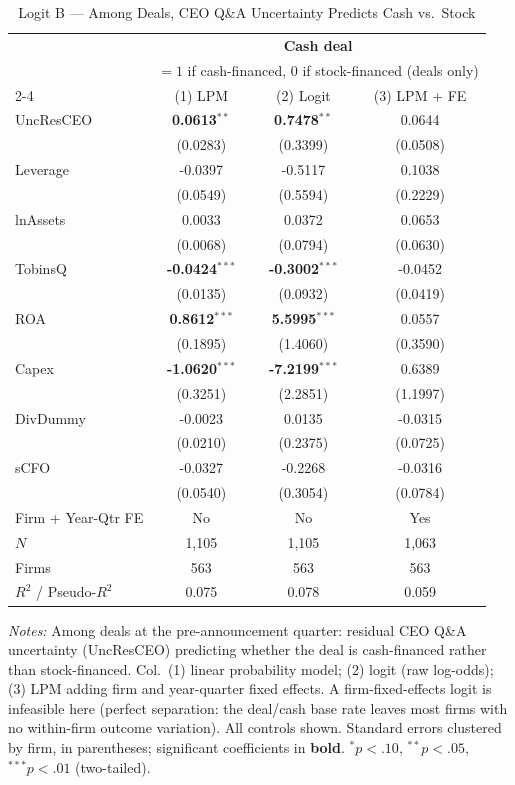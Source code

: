 \clearpage
\begin{table}[htbp]\centering
\caption{Logit B --- Among Deals, CEO Q\&A Uncertainty Predicts Cash vs.\ Stock}
\label{tab:logit_cashstock}
\small\begin{tabular}{lccc}
\toprule
 & \multicolumn{3}{c}{\textbf{Cash deal}} \\
 & \multicolumn{3}{c}{\scriptsize $=1$ if cash-financed, $0$ if stock-financed (deals only)} \\
\cmidrule(lr){2-4}
 & (1) LPM & (2) Logit & (3) LPM + FE \\
\midrule
UncResCEO & \textbf{0.0613}$^{**}$ & \textbf{0.7478}$^{**}$ & 0.0644 \\
 & (0.0283) & (0.3399) & (0.0508) \\
\midrule
Leverage & -0.0397 & -0.5117 & 0.1038 \\
 & (0.0549) & (0.5594) & (0.2229) \\
lnAssets & 0.0033 & 0.0372 & 0.0653 \\
 & (0.0068) & (0.0794) & (0.0630) \\
TobinsQ & \textbf{-0.0424}$^{***}$ & \textbf{-0.3002}$^{***}$ & -0.0452 \\
 & (0.0135) & (0.0932) & (0.0419) \\
ROA & \textbf{0.8612}$^{***}$ & \textbf{5.5995}$^{***}$ & 0.0557 \\
 & (0.1895) & (1.4060) & (0.3590) \\
Capex & \textbf{-1.0620}$^{***}$ & \textbf{-7.2199}$^{***}$ & 0.6389 \\
 & (0.3251) & (2.2851) & (1.1997) \\
DivDummy & -0.0023 & 0.0135 & -0.0315 \\
 & (0.0210) & (0.2375) & (0.0725) \\
sCFO & -0.0327 & -0.2268 & -0.0316 \\
 & (0.0540) & (0.3054) & (0.0784) \\
\midrule
Firm + Year-Qtr FE & No & No & Yes \\
$N$ & 1,105 & 1,105 & 1,063 \\
Firms & 563 & 563 & 563 \\
$R^2$ / Pseudo-$R^2$ & 0.075 & 0.078 & 0.059 \\
\bottomrule\end{tabular}
\begin{minipage}{\linewidth}\vspace{2pt}\scriptsize\textit{Notes:} Among deals at the pre-announcement quarter: residual CEO Q\&A uncertainty (UncResCEO) predicting whether the deal is cash-financed rather than stock-financed. Col.\ (1) linear probability model; (2) logit (raw log-odds); (3) LPM adding firm and year-quarter fixed effects. A firm-fixed-effects logit is infeasible here (perfect separation: the deal/cash base rate leaves most firms with no within-firm outcome variation). All controls shown. Standard errors clustered by firm, in parentheses; significant coefficients in \textbf{bold}. $^{*}p<.10$, $^{**}p<.05$, $^{***}p<.01$ (two-tailed).\end{minipage}
\end{table}
